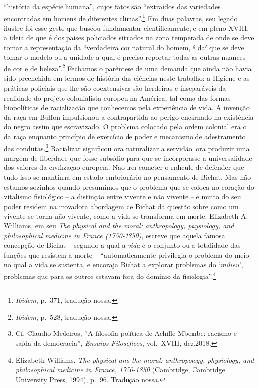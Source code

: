 ``história da espécie humana'', cujos fatos são ``extraídos das
variedades encontradas em homens de diferentes climas''.\footnote{\emph{Ibidem},
  p.~371, tradução nossa.} Em duas palavras, seu legado ilustre foi esse
gesto que buscou fundamentar cientificamente, e em pleno XVIII, a ideia
de que é dos países policiados situados na zona temperada de onde se
deve tomar a representação da ``verdadeira cor natural do homem, é daí
que se deve tomar o modelo ou a unidade a qual é preciso reportar todas
as outras nuances de cor e de beleza''.\footnote{\emph{Ibidem}, p.~528,
  tradução nossa.} Fechamos o parêntese de uma demanda que ainda não
havia sido preenchida em termos de história das ciências neste trabalho:
a Higiene e as práticas policiais que lhe são coextensivas são herdeiras
e inseparáveis da realidade do projeto colonialista europeu na América,
tal como das formas biopolíticas de racialização que conhecemos pela
experiência de vida. A invenção da raça em Buffon impulsionou a
contrapartida ao perigo encarnado na existência do negro assim que
escravizado. O problema colocado pela ordem colonial era o da raça
enquanto princípio de exercício de poder e mecanismo de adestramento das
condutas.\footnote{Cf. Claudio Medeiros, ``A filosofia política de
  Achille Mbembe: racismo e saída da democracia'', \emph{Ensaios
  Filosóficos}, vol.~XVIII, dez.2018.} Racializar significou ora
naturalizar a servidão, ora produzir uma margem de liberdade que fosse
subsídio para que se incorporasse a universalidade dos valores da
civilização europeia. Não irei cometer o ridículo de defender que tudo
isso se mantinha em estado embrionário no pensamento de Bichat. Mas não
estamos sozinhos quando presumimos que o problema que se coloca no
coração do vitalismo fisiológico -- a distinção entre vivente e não
vivente -- e muito do seu poder residem na inovadora abordagem de Bichat
da questão sobre como um vivente se torna não vivente, como a vida se
transforma em morte. Elizabeth A. Williams, em seu \emph{The physical
and the moral: anthropology, physiology, and philosophical medicine in
France (1750-1850)}, escreve que aquela famosa concepção de Bichat --
segundo a qual a \emph{vida} é o conjunto ou a totalidade das funções
que resistem à morte -- ``automaticamente privilegia o problema do meio
no qual a vida se sustenta, e encoraja Bichat a explorar problemas do
`\emph{milieu}', problemas que para os outros estavam fora do domínio da
fisiologia''.\footnote{Elizabeth Williams, \emph{The physical and the
  moral: anthropology, physiology, and philosophical medicine in France,
  1750-1850} (Cambridge, Cambridge University Press, 1994), p.~96.
  Tradução nossa.}

